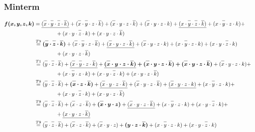 \documentclass{article}
\newcommand*{\oline}[1]{\overline{#1\mathstrut}}
\newcommand{\bigspace}{\quad\quad\quad\quad}
\begin{document}
\subsubsection*{Minterm}
\begin{align*}
  \bm{f(x,y,z,k)} &= \underline{(\oline{x} \cdot \oline{y} \cdot \oline{z} \cdot \oline{k})} + (\oline{x} \cdot \oline{y} \cdot z \cdot \oline{k}) + (\oline{x} \cdot y \cdot z \cdot \oline{k}) + (\oline{x} \cdot y \cdot z \cdot k) + \underline{(x \cdot \oline{y} \cdot \oline{z} \cdot \oline{k})} + (x \cdot \oline{y} \cdot z \cdot k) + \\
  &\bigspace + (x \cdot y \cdot \oline{z} \cdot k) + (x \cdot y \cdot z \cdot \oline{k})\\
  &\overset{T9}{=} \bm{(\oline{y} \cdot \oline{z} \cdot \oline{k})} + (\oline{x} \cdot \oline{y} \cdot z \cdot \oline{k}) + \underline{(\oline{x} \cdot y \cdot z \cdot \oline{k})} + (\oline{x} \cdot y \cdot z \cdot k) + (x \cdot \oline{y} \cdot z \cdot k) + (x \cdot y \cdot \oline{z} \cdot k)\\
  &\bigspace + (x \cdot y \cdot z \cdot \oline{k})\\
  &\overset{T1}{=} (\oline{y} \cdot \oline{z} \cdot \oline{k}) + \underline{(\oline{x} \cdot \oline{y} \cdot z \cdot \oline{k})} + \bm{\underline{(\oline{x} \cdot y \cdot z \cdot \oline{k})} + (\oline{x} \cdot y \cdot z \cdot \oline{k}) + (\oline{x} \cdot y \cdot z \cdot \oline{k})} + (\oline{x} \cdot y \cdot z \cdot k) + \\
  &\bigspace + (x \cdot \oline{y} \cdot z \cdot k) + (x \cdot y \cdot \oline{z} \cdot k) + (x \cdot y \cdot z \cdot \oline{k})\\
  &\overset{T9}{=} (\oline{y} \cdot \oline{z} \cdot \oline{k}) + \bm{(\oline{x} \cdot z \cdot \oline{k})} + \underline{(\oline{x} \cdot y \cdot z \cdot \oline{k})} + (\oline{x} \cdot y \cdot z \cdot \oline{k}) + \underline{(\oline{x} \cdot y \cdot z \cdot k)} + (x \cdot \oline{y} \cdot z \cdot k) + \\
  &\bigspace + (x \cdot y \cdot \oline{z} \cdot k) + (x \cdot y \cdot z \cdot \oline{k})\\
  &\overset{T9}{=} (\oline{y} \cdot \oline{z} \cdot \oline{k}) + (\oline{x} \cdot z \cdot \oline{k}) + \bm{(\oline{x} \cdot y \cdot z)} + \underline{(\oline{x} \cdot y \cdot z \cdot \oline{k})} + (x \cdot \oline{y} \cdot z \cdot k) + (x \cdot y \cdot \oline{z} \cdot k) + \\
  &\bigspace + \underline{(x \cdot y \cdot z \cdot \oline{k})}\\
  &\overset{T9}{=} (\oline{y} \cdot \oline{z} \cdot \oline{k}) + (\oline{x} \cdot z \cdot \oline{k}) + (\oline{x} \cdot y \cdot z) + \bm{(y \cdot z \cdot \oline{k})} + (x \cdot \oline{y} \cdot z \cdot k) + (x \cdot y \cdot \oline{z} \cdot k)
\end{align*}
\end{document}
